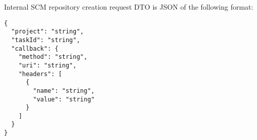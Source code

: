 \documentclass[../main.tex]{subfiles}
\begin{document}
Internal SCM repository creation request DTO is JSON of the following format:

\begin{lstlisting}[numbers=none]
{
  "project": "string",
  "taskId": "string",
  "callback": {
    "method": "string",
    "uri": "string",
    "headers": [
      {
        "name": "string",
        "value": "string"
      }
    ]
  }
}
\end{lstlisting}

\end{document}
